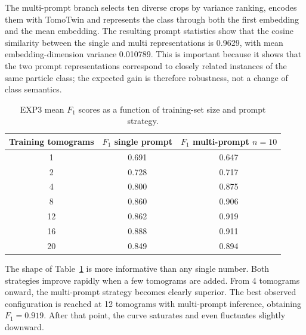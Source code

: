 \documentclass[12pt,a4paper]{report}
\begin{document}
The multi-prompt branch selects ten diverse crops by variance ranking, encodes them with TomoTwin and represents the class through both the first embedding and the mean embedding. The resulting prompt statistics show that the cosine similarity between the single and multi representations is 0.9629, with mean embedding-dimension variance 0.010789. This is important because it shows that the two prompt representations correspond to closely related instances of the same particle class; the expected gain is therefore robustness, not a change of class semantics.

\begin{table}[H]
  \centering
  \small
  \begin{tabular}{ccc}
    \toprule
    Training tomograms & \(F_1\) single prompt & \(F_1\) multi-prompt \(n=10\) \\
    \midrule
    1 & 0.691 & 0.647 \\
    2 & 0.728 & 0.717 \\
    4 & 0.800 & 0.875 \\
    8 & 0.860 & 0.906 \\
    12 & 0.862 & 0.919 \\
    16 & 0.888 & 0.911 \\
    20 & 0.849 & 0.894 \\
    \bottomrule
  \end{tabular}
  \caption{EXP3 mean \(F_1\) scores as a function of training-set size and prompt strategy.}
  \label{tab:exp3-f1}
\end{table}

The shape of Table~\ref{tab:exp3-f1} is more informative than any single number. Both strategies improve rapidly when a few tomograms are added. From 4 tomograms onward, the multi-prompt strategy becomes clearly superior. The best observed configuration is reached at 12 tomograms with multi-prompt inference, obtaining \(F_1=0.919\). After that point, the curve saturates and even fluctuates slightly downward.
\end{document}
